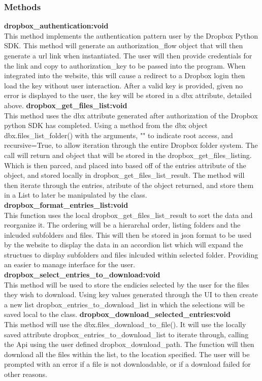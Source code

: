 \subsubsection{Methods}
\textbf{dropbox\_authentication:void} \\
    This method implements the authentication pattern user by the Dropbox Python SDK. This method will generate an authorization\_flow object
    that will then generate a url link when instantiated. The user will then provide credentials for the link and copy to authorization\_key 
    to be passed into the program. When integrated into the website, this will cause a redirect to a Dropbox login then load the key without 
    user interaction. After a valid key is provided, given no error is displayed to the user, the key will be stored in a dbx attribute, detailed 
    above.  
\textbf{dropbox\_get\_files\_list:void} \\
    This method uses the dbx attribute generated after authorization of the Dropbox python SDK has completed. Using a method from the dbx object
    dbx.files\_list\_folder() with the arguments, "" to indicate root access, and recursive=True, to allow iteration through the entire Dropbox
    folder system. The call will return and object that will be stored in the dropbox\_get\_files\_listing. Which is then parced, and placed into
    based off of the entries attribute of the object, and stored locally in dropbox\_get\_files\_list\_result. The method will then iterate through
    the entries, atribute of the object returned, and store them in a List to later be manipulated by the class.
\textbf{dropbox\_format\_entries\_list:void} \\
    This function uses the local dropbox_get_files_list_result to sort the data and reorganize it. The ordering will be a hierarchal order, listing 
    folders and the inlcuded subfolders and files. This will then be stored in json format to be used by the website to display the data in an
    accordion list which will expand the structues to display subfolders and files inlcuded within selected folder. Providing an easier to manage
    interface for the user.
\textbf{dropbox\_select\_entries\_to\_download:void} \\
    This method will be used to store the endicies selected by the user for the files they wish to download. Using key values generated through 
    the UI to then create a new list dropbox\_entries\_to\_download\_list in which the selections will be saved local to the class.
\textbf{dropbox\_download\_selected\_entries:void} \\
    This method will use the dbx.files_download_to_file(). It will use the locally saved attribute dropbox\_entries\_to\_download\_list to
    iterate through, calling the Api using the user defined dropbox\_download\_path. The function will then download all the files within the 
    list, to the location specified. The user will be prompted with an error if a file is not downloadable, or if a download failed for other 
    reasons.

